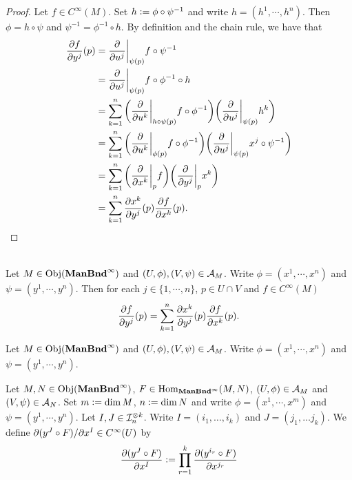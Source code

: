 \documentclass{book}
\begin{document}
\begin{proof}
	Let $f \in C^{\infty}(M)$. Set $h \vcentcolon= \phi \circ \psi^{-1}$ and write $h = (h^1, \cdots, h^n)$. Then $\phi = h \circ \psi$ and $\psi^{-1} = \phi^{-1} \circ h$. By definition and the chain rule, we have that 
	\begin{align*}
		\frac{\partial f}{\partial y^j} (p) 
		&= \frac{\partial}{\partial u^j} \bigg|_{\psi(p)} f \circ \psi^{-1} \\
		&= \frac{\partial}{\partial u^j} \bigg|_{\psi(p)} f \circ \phi^{-1} \circ h \\
		&= \sum_{k=1}^n \bigg(\frac{\partial}{\partial u^k} \bigg|_{h \circ \psi (p)} f \circ \phi^{-1} \bigg)  \bigg( \frac{\partial}{\partial u^j} \bigg|_{\psi(p)} h^k \bigg) \\
		&= \sum_{k=1}^n \bigg(\frac{\partial}{\partial u^k} \bigg|_{\phi (p)} f \circ \phi^{-1}  \bigg) \bigg( \frac{\partial}{\partial u^j} \bigg|_{\psi(p)} x^j \circ \psi^{-1} \bigg) \\
		&= \sum_{k=1}^n \bigg( \frac{\partial}{\partial x^k} \bigg|_p f \bigg)  \bigg(   \frac{\partial}{\partial y^j} \bigg|_p x^k  \bigg)\\
		& = \sum_{k =1}^n \frac{\partial x^k}{\partial y^j}(p)  \frac{\partial f}{\partial x^k}(p).
	\end{align*}
\end{proof}

\begin{ex} \\
	Let $M \in \operatorname{Obj}(\operatorname*{\text{\textbf{ManBnd}}^{\infty}})$ and $(U, \phi), (V, \psi) \in \mathcal{A}_M$. Write $\phi = (x^1, \cdots, x^n)$ and $\psi = (y^1, \cdots, y^n)$. Then for each $j \in \{1, \cdots, n\}$, $p \in U \cap V$ and $f \in C^{\infty}(M)$ 
	$$\frac{\partial f}{\partial y^j}(p) = \sum_{k =1}^n \frac{\partial x^k}{\partial y^j}(p)  \frac{\partial f}{\partial x^k}(p).$$
\end{ex}



\begin{defn}
	Let $M \in \operatorname{Obj}(\operatorname*{\text{\textbf{ManBnd}}^{\infty}})$ and $(U, \phi), (V, \psi) \in \mathcal{A}_M$. Write $\phi = (x^1, \cdots, x^n)$ and $\psi = (y^1, \cdots, y^n)$. 
\end{defn}

\begin{defn}
	Let $M, N \in \operatorname{Obj}(\operatorname*{\text{\textbf{ManBnd}}^{\infty}})$, $F \in \operatorname{Hom}_{\operatorname*{\text{\textbf{ManBnd}}^{\infty}}}(M, N)$, $(U, \phi) \in \mathcal{A}_M$ and $(V, \psi) \in \mathcal{A}_N$. Set $m \vcentcolon= \dim M$, $n \vcentcolon= \dim N$ and write $\phi = (x^1, \cdots, x^m)$ and $\psi = (y^1, \cdots, y^n)$. Let $I, J \in \mathcal{I}_n^{\otimes k}$. Write $I = (i_1, \ldots, i_k)$ and $J = (j_1, \ldots j_k)$. We define $\partial (y^J \circ F)/ \partial x^I \in C^{\infty}(U)$ by 
	$$\frac{\partial (y^J \circ F)}{\partial x^I} \vcentcolon= \prod\limits_{r =1}^k \frac{\partial (y^{i_r} \circ F)}{\partial x^{j_r}}$$
\end{defn}
\end{document}
